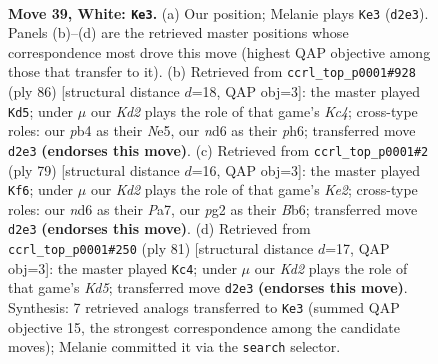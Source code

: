\documentclass[11pt]{article}
\begin{document}
\clearpage

\begin{figure}[p]\centering
\begin{subfigure}{0.46\textwidth}\centering
\resizebox{\linewidth}{!}{%
\newchessgame
\chessboard[
  setfen={3k4/4b3/3n4/8/1p6/1P6/3K2p1/8 w - - 0 39},
  showmover=false,
  pgfstyle=straightmove, color=movearrow, markmove={d2-e3}
]}
\caption{}
\end{subfigure}\hfill
\begin{subfigure}{0.46\textwidth}\centering
\resizebox{\linewidth}{!}{%
\newchessgame
\chessboard[
  setfen={5b2/6k1/7p/4N3/2K2p2/7P/1P6/8 w - - 0 44},
  showmover=false,
  pgfstyle=straightmove, color=movearrow, markmove={c4-d5}
]}
\caption{}
\end{subfigure}
\\[4pt]
\begin{subfigure}{0.46\textwidth}\centering
\resizebox{\linewidth}{!}{%
\newchessgame
\chessboard[
  setfen={8/p3k3/1b6/6p1/8/3B3P/P3K3/8 b - - 1 40},
  showmover=false,
  pgfstyle=straightmove, color=movearrow, markmove={e7-f6}
]}
\caption{}
\end{subfigure}\hfill
\begin{subfigure}{0.46\textwidth}\centering
\resizebox{\linewidth}{!}{%
\newchessgame
\chessboard[
  setfen={8/8/8/6p1/1b1k4/5P2/5N2/5K2 b - - 1 41},
  showmover=false,
  pgfstyle=straightmove, color=movearrow, markmove={d4-c4}
]}
\caption{}
\end{subfigure}
\caption{\textbf{Move 39, White: \texttt{Ke3}.} (a) Our position; Melanie plays \texttt{Ke3} (\texttt{d2e3}). Panels (b)--(d) are the retrieved master positions whose correspondence most drove this move (highest QAP objective among those that transfer to it). (b) Retrieved from \texttt{ccrl\_top\_p0001\#928} (ply 86) [structural distance $d$=18, QAP obj=3]: the master played \texttt{Kd5}; under $\mu$ our \emph{Kd2} plays the role of that game's \emph{Kc4}; cross-type roles: our \emph{p}b4 as their \emph{N}e5, our \emph{n}d6 as their \emph{p}h6; transferred move \texttt{d2e3} \textbf{(endorses this move)}. (c) Retrieved from \texttt{ccrl\_top\_p0001\#2} (ply 79) [structural distance $d$=16, QAP obj=3]: the master played \texttt{Kf6}; under $\mu$ our \emph{Kd2} plays the role of that game's \emph{Ke2}; cross-type roles: our \emph{n}d6 as their \emph{P}a7, our \emph{p}g2 as their \emph{B}b6; transferred move \texttt{d2e3} \textbf{(endorses this move)}. (d) Retrieved from \texttt{ccrl\_top\_p0001\#250} (ply 81) [structural distance $d$=17, QAP obj=3]: the master played \texttt{Kc4}; under $\mu$ our \emph{Kd2} plays the role of that game's \emph{Kd5}; transferred move \texttt{d2e3} \textbf{(endorses this move)}. Synthesis: 7 retrieved analogs transferred to \texttt{Ke3} (summed QAP objective 15, the strongest correspondence among the candidate moves); Melanie committed it via the \texttt{search} selector.}
\label{fig:thought-m76}
\end{figure}
\end{document}
